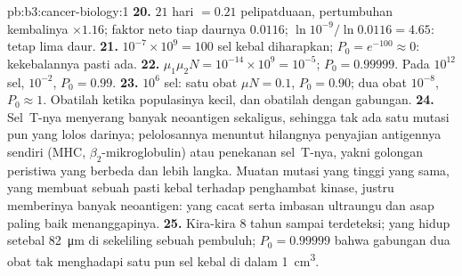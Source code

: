 \begin{solution}{pb:b3:cancer-biology:1}
\textbf{20.} $21$ hari $= 0.21$ pelipatduaan, pertumbuhan kembalinya
$\times 1.16$; faktor neto tiap daurnya $0.0116$; $\ln 10^{-9}/\ln 0.0116 = 4.65$:
tetap lima daur.
\textbf{21.} $10^{-7}\times 10^{9} = 100$ sel kebal diharapkan;
$P_{0} = e^{-100} \approx 0$: kekebalannya pasti ada.
\textbf{22.} $\mu_{1}\mu_{2}N = 10^{-14}\times 10^{9} = 10^{-5}$;
$P_{0} = 0.99999$. Pada $10^{12}$ sel, $10^{-2}$, $P_{0} = 0.99$.
\textbf{23.} $10^{6}$ sel: satu obat $\mu N = 0.1$, $P_{0} = 0.90$; dua
obat $10^{-8}$, $P_{0} \approx 1$. Obatilah ketika populasinya kecil,
dan obatilah dengan gabungan.
\textbf{24.} Sel~T-nya menyerang banyak neoantigen sekaligus, sehingga tak
ada satu mutasi pun yang lolos darinya; pelolosannya menuntut hilangnya
penyajian antigennya sendiri (MHC, $\beta_{2}$-mikroglobulin) atau penekanan
sel~T-nya, yakni golongan peristiwa yang berbeda dan lebih langka. Muatan
mutasi yang tinggi yang sama, yang membuat sebuah  pasti kebal terhadap
penghambat kinase, justru memberinya banyak neoantigen:  yang  cacat serta  imbasan ultraungu dan asap paling baik
menanggapinya.
\textbf{25.} Kira-kira $8$ tahun sampai terdeteksi;  yang hidup setebal
\qty{82}{\micro m} di sekeliling sebuah pembuluh; $P_{0} = 0.99999$ bahwa
gabungan dua obat tak menghadapi satu pun sel kebal di dalam  \qty{1}{cm^3}.
\end{solution}
